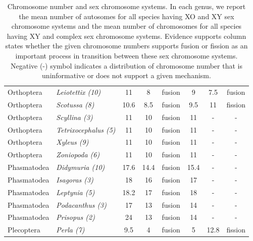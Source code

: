 \documentclass[]{rsos}%
\begin{document}
\begin{table}[!ht]
\begin{tabular}{llcccccc}
Orthoptera  & \textit{Leiotettix (10)}     & 11   & 8    & fusion & 9    & 7.5   & fusion  \\
Orthoptera  & \textit{Scotussa (8)}        & 10.6 & 8.5  & fusion & 9.5  & 11    & fission \\
Orthoptera  & \textit{Scyllina (3)}        & 11   & 10   & fusion & 11   & -     & -       \\
Orthoptera  & \textit{Tetrixocephalus (5)} & 11   & 10   & fusion & 11   & -     & -       \\
Orthoptera  & \textit{Xyleus (9)}          & 11   & 10   & fusion & 11   & -     & -       \\
Orthoptera  & \textit{Zoniopoda (6)}       & 11   & 10   & fusion & 11   & -     & -       \\
Phasmatodea & \textit{Didymuria (10)}      & 17.6 & 14.4 & fusion & 15.4 & -     & -       \\
Phasmatodea & \textit{Isagoras (3)}        & 18   & 16   & fusion & 17   & -     & -       \\
Phasmatodea & \textit{Leptynia (5)}        & 18.2 & 17   & fusion & 18   & -     & -       \\
Phasmatodea & \textit{Podacanthus (3)}     & 17   & 13   & fusion & 14   & -     & -       \\
Phasmatodea & \textit{Prisopus (2)}        & 24   & 13   & fusion & 14   & -     & -       \\
Plecoptera  & \textit{Perla (7)}           & 9.5  & 4    & fusion & 5    & 12.8  & fission \\ \hline
\end{tabular}
\caption{Chromosome number and sex chromosome systems. In each genus, we report the mean number of autosomes for all species having XO and XY sex chromosome systems and the mean number of chromosomes for all species having XY and complex sex chromosome systems. Evidence supports column states whether the given chromosome numbers supports fusion or fission as an important process in transition between these sex chromosome systems. Negative (-) symbol indicates a distribution of chromosome number that is uninformative or does not support a given mechanism.}
\label{tab:fusions}
\end{table}

\vspace*{-10pt}

\noindent 
\end{document}
